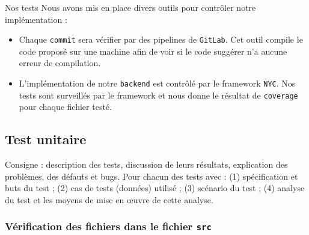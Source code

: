 \newenvironment{mytest}[4]
{
    \begin{center}
        \centering
        \begin{tabular}[h]{|m{4cm}|m{12cm}|}
            \hline
            \rowcolor[HTML]{F8B400}
            \textbf{But}    & #1 \\
            \hline
            \hline
            \rowcolor[HTML]{F7F7F7}
            Entrée          & #2 \\
            \hline
            \rowcolor[HTML]{F7F7F7}
            Scénario        & #3 \\
            \hline
            \rowcolor[HTML]{F7F7F7}
            Analyse du test & #4 \\
            \hline
        \end{tabular}
    \end{center}
}

\section{Nos tests}
Nous avons mis en place divers outils pour contrôler notre implémentation :
\begin{itemize}
    \item Chaque {\tt commit} sera vérifier par des pipelines de {\tt GitLab}. Cet outil compile le code proposé sur une machine afin de voir si le code suggérer n'a aucune erreur de compilation.
    \item L'implémentation de notre {\tt backend} est contrôlé par le framework {\tt NYC}. Nos tests sont surveillés par le framework et nous donne le résultat de {\tt coverage} pour chaque fichier testé.
\end{itemize}

\subsection{Test unitaire}

Consigne : description des tests, discussion de leurs résultats, explication des problèmes, des défauts et bugs. Pour chacun des tests avec : (1) spécification et buts du test ;
(2) cas de tests (données) utilisé ; (3) scénario du test ; (4) analyse du test et les moyens de mise en œuvre de cette analyse.

\subsubsection{Vérification des fichiers dans le fichier {\tt src}}

